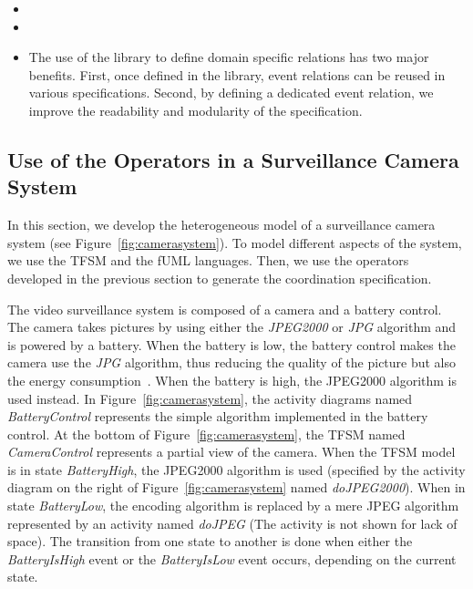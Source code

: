 \begin{itemize}
		\item {}
		
		\item {}
	
		\item The use of the library to define domain specific relations has two major benefits. First, once defined in the library, event relations can be reused in various \bcool specifications. Second, by defining a dedicated event relation, we improve the readability and modularity of the \bcool specification.
	
	\end{itemize}

	\subsection{Use of the Operators in a Surveillance Camera System}
	In this section, we develop the heterogeneous model of a surveillance camera system (see Figure~\ref{fig:camerasystem}). To model different aspects of the system, we use the TFSM and the fUML languages. Then, we use the operators developed in the previous section to generate the coordination specification. 
	
	The video surveillance system is composed of a camera and a battery control. The camera takes pictures by using either the \emph{JPEG2000} or \emph{JPG} algorithm and is powered by a battery. When the battery is low, the battery control makes the camera use the \emph{JPG} algorithm, thus reducing the quality of the picture but also the energy consumption~\cite{encodingcomparison}. When the battery is high, the JPEG2000 algorithm is used instead. In Figure~\ref{fig:camerasystem}, the activity diagrams named \emph{BatteryControl} represents the simple algorithm implemented in the battery control. At the bottom of Figure~\ref{fig:camerasystem}, the TFSM named \emph{CameraControl} represents a partial view of the camera. When the TFSM model is in state \emph{BatteryHigh}, the JPEG2000 algorithm is used (specified by the activity diagram on the right of Figure~\ref{fig:camerasystem} named \emph{doJPEG2000}). When in state \emph{BatteryLow}, the encoding algorithm is replaced by a mere JPEG algorithm represented by an activity named \emph{doJPEG} (The activity is not shown for lack of space). The transition from one state to another is done when either the \emph{BatteryIsHigh} event or the \emph{BatteryIsLow} event occurs, depending on the current state.	 
	
